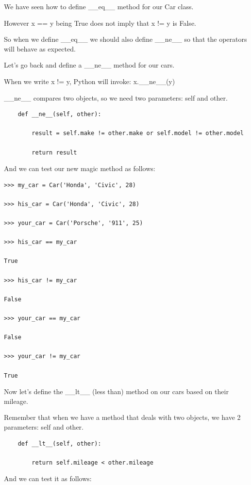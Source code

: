 \documentclass{article}
\begin{document}
We have seen how to define  {\_}{\_}eq{\_}{\_} method for our Car class. 

However x == y being True does not imply that x != y is False. 

So when we define {\_}{\_}eq{\_}{\_} we should also define {\_}{\_}ne{\_}{\_} so that the operators will behave as expected. 

Let’s go back and define a {\_}{\_}ne{\_}{\_} method for our cars.

When we write x != y, Python will invoke:  x.{\_}{\_}ne{\_}{\_}(y)

{\_}{\_}ne{\_}{\_} compares two objects, so we need two parameters: self and other.

\begin{lstlisting}
    def __ne__(self, other):

        result = self.make != other.make or self.model != other.model

        return result
\end{lstlisting}

And we can test our new magic method as follows:

\begin{lstlisting}
>>> my_car = Car('Honda', 'Civic', 28)

>>> his_car = Car('Honda', 'Civic', 28)

>>> your_car = Car('Porsche', '911', 25)

>>> his_car == my_car

True

>>> his_car != my_car

False

>>> your_car == my_car

False

>>> your_car != my_car

True
\end{lstlisting}

Now let's define the {\_}{\_}lt{\_}{\_} (less than) method on our cars based on their mileage.

Remember that when we have a method that deals with two objects, we have 2 parameters: self and other.

\begin{lstlisting}
    def __lt__(self, other):

        return self.mileage < other.mileage
\end{lstlisting}

And we can test it as follows:
\end{document}
